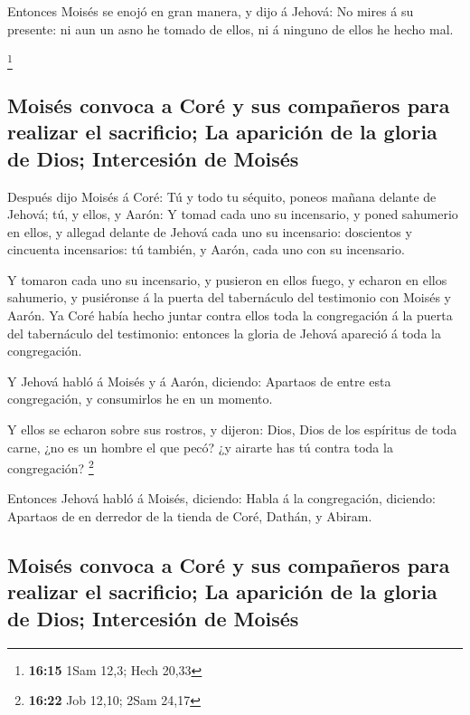  Entonces Moisés se enojó en gran manera, y dijo á
Jehová: No mires á su presente: ni aun un asno he tomado de ellos, ni á
ninguno de ellos he hecho mal.

\footnote{\textbf{16:15} 1Sam 12,3; Hech 20,33}

\hypertarget{moisuxe9s-convoca-a-coruxe9-y-sus-compauxf1eros-para-realizar-el-sacrificio-la-apariciuxf3n-de-la-gloria-de-dios-intercesiuxf3n-de-moisuxe9s}{%
\subsection{Moisés convoca a Coré y sus compañeros para realizar el
sacrificio; La aparición de la gloria de Dios; Intercesión de
Moisés}\label{moisuxe9s-convoca-a-coruxe9-y-sus-compauxf1eros-para-realizar-el-sacrificio-la-apariciuxf3n-de-la-gloria-de-dios-intercesiuxf3n-de-moisuxe9s}}

 Después dijo Moisés á Coré: Tú y todo tu séquito, poneos
mañana delante de Jehová; tú, y ellos, y Aarón:  Y tomad
cada uno su incensario, y poned sahumerio en ellos, y allegad delante de
Jehová cada uno su incensario: doscientos y cincuenta incensarios: tú
también, y Aarón, cada uno con su incensario.

 Y tomaron cada uno su incensario, y pusieron en ellos
fuego, y echaron en ellos sahumerio, y pusiéronse á la puerta del
tabernáculo del testimonio con Moisés y Aarón.  Ya Coré
había hecho juntar contra ellos toda la congregación á la puerta del
tabernáculo del testimonio: entonces la gloria de Jehová apareció á toda
la congregación.

 Y Jehová habló á Moisés y á Aarón, diciendo:
 Apartaos de entre esta congregación, y consumirlos he en
un momento.

 Y ellos se echaron sobre sus rostros, y dijeron: Dios,
Dios de los espíritus de toda carne, ¿no es un hombre el que pecó? ¿y
airarte has tú contra toda la congregación? \footnote{\textbf{16:22} Job
  12,10; 2Sam 24,17}

 Entonces Jehová habló á Moisés, diciendo:
 Habla á la congregación, diciendo: Apartaos de en
derredor de la tienda de Coré, Dathán, y Abiram.

\hypertarget{moisuxe9s-convoca-a-coruxe9-y-sus-compauxf1eros-para-realizar-el-sacrificio-la-apariciuxf3n-de-la-gloria-de-dios-intercesiuxf3n-de-moisuxe9s-1}{%
\subsection{Moisés convoca a Coré y sus compañeros para realizar el
sacrificio; La aparición de la gloria de Dios; Intercesión de
Moisés}\label{moisuxe9s-convoca-a-coruxe9-y-sus-compauxf1eros-para-realizar-el-sacrificio-la-apariciuxf3n-de-la-gloria-de-dios-intercesiuxf3n-de-moisuxe9s-1}}

